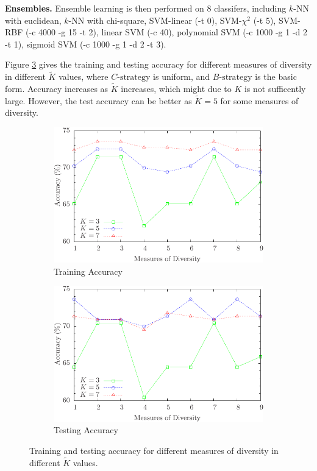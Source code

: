\textbf{Ensembles.} Ensemble learning is then performed on 8 classifers, including $k$-NN with euclidean, $k$-NN with chi-square, SVM-linear (-t 0), SVM-$\chi^2$ (-t 5), SVM-RBF (-c 4000 -g 15 -t 2), linear SVM (-c 40), polynomial SVM (-c 1000 -g 1 -d 2 -t 1), sigmoid SVM (-c 1000 -g 1 -d 2 -t 3).

Figure \ref{fig:diversity_k} gives the training and testing accuracy for different measures of diversity in different $\tilde{K}$ values, where $C\text{-strategy}$ is uniform, and $B\text{-strategy}$ is the basic form. Accuracy increases as $\tilde{K}$ increases, which might due to $K$ is not sufficently large. However, the test accuracy can be better as
$\tilde{K}=5$ for some measures of diversity.

\begin{figure} [t]
\centering
\begin{subfigure}{.45\textwidth}
  \centering
  \includegraphics[width=.95\linewidth]{../Figure/diversity_k_train}
  \caption{Training Accuracy}
  \label{fig:diversity_k_train}
\end{subfigure}%
\begin{subfigure}{.45\textwidth}
  \centering
  \includegraphics[width=.95\linewidth]{../Figure/diversity_k_test}
  \caption{Testing Accuracy}
  \label{fig:diversity_k_test}
\end{subfigure}
\caption{Training and testing accuracy for different measures of diversity in different $\tilde{K}$ values.}
\label{fig:diversity_k}
\end{figure}

